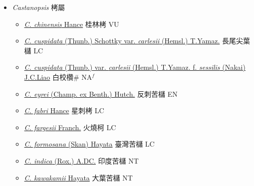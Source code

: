 
  \begin{itemize}
 \item[] \textit{Castanopsis} 栲屬
                    
  \begin{itemize}
        \item[] \href{http://www.theplantlist.org/tpl1.1/search?q=Castanopsis+chinensis}{\textit{C. chinensis} Hance}   桂林栲 VU
        \item[] \href{http://www.theplantlist.org/tpl1.1/search?q=Castanopsis+cuspidata+var.+carlesii}{\textit{C. cuspidata} (Thunb.) Schottky var. \textit{carlesii} (Hemsl.) T.Yamaz.}   長尾尖葉櫧 LC
        \item[] \href{http://www.theplantlist.org/tpl1.1/search?q=Castanopsis+cuspidata+var.+carlesii+ f. +sessilis}{\textit{C. cuspidata} (Thunb.) var. \textit{carlesii} (Hemsl.) T.Yamaz.  f.  \textit{sessilis} (Nakai) J.C.Liao}   白校欑\# NA$^f$
        \item[] \href{http://www.theplantlist.org/tpl1.1/search?q=Castanopsis+eyrei}{\textit{C. eyrei} (Champ. ex Benth.) Hutch.}   反刺苦櫧 EN
        \item[] \href{http://www.theplantlist.org/tpl1.1/search?q=Castanopsis+fabri}{\textit{C. fabri} Hance}   星刺栲 LC
        \item[] \href{http://www.theplantlist.org/tpl1.1/search?q=Castanopsis+fargesii}{\textit{C. fargesii} Franch.}   火燒柯 LC
        \item[] \href{http://www.theplantlist.org/tpl1.1/search?q=Castanopsis+formosana}{\textit{C. formosana} (Skan) Hayata}   臺灣苦櫧 LC
        \item[] \href{http://www.theplantlist.org/tpl1.1/search?q=Castanopsis+indica}{\textit{C. indica} (Rox.) A.DC.}   印度苦櫧 NT
        \item[] \href{http://www.theplantlist.org/tpl1.1/search?q=Castanopsis+kawakamii}{\textit{C. kawakamii} Hayata}   大葉苦櫧 NT

\end{itemize}
\end{itemize}
